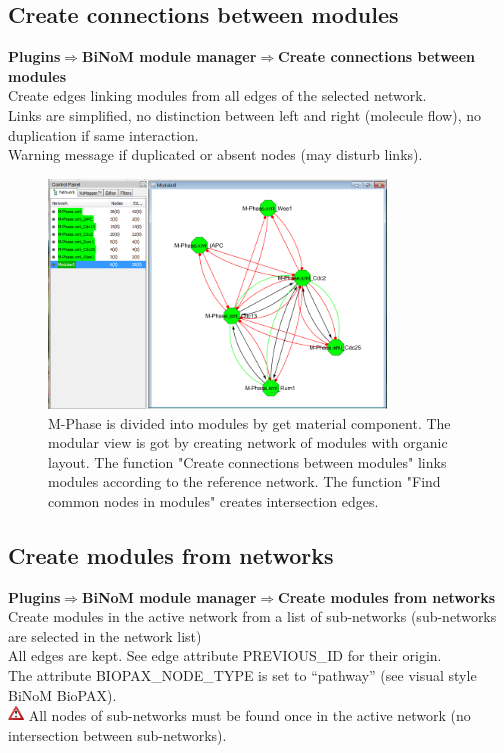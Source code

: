 \subsection{Create connections between modules}
\textbf{Plugins$\Rightarrow$BiNoM module manager$\Rightarrow$Create connections between modules}\\
Create edges linking modules from all edges of the selected network.\\
Links are simplified, no distinction between left and right (molecule flow), no duplication if same interaction.\\
Warning message if duplicated or absent nodes (may disturb links).
\begin{figure}
\centering
\includegraphics[width=0.8\textwidth]{graphics/M-Phase_Material_Modular}
\caption{M-Phase is divided into modules by get material component. The modular view is got by creating network of modules with organic layout. The function "Create connections between modules" links modules according to the reference network. The function "Find common nodes in modules" creates intersection edges. }
\label{M-Phase_Material_Modular}
\end{figure}

\subsection{Create modules from networks}
\textbf{Plugins$\Rightarrow$BiNoM module manager$\Rightarrow$Create modules from networks}\\
Create modules in the active network from a list of sub-networks (sub-networks are selected in the network list)\\
All edges are kept. See edge attribute PREVIOUS\_ID for their origin.\\
The attribute BIOPAX\_NODE\_TYPE is set to “pathway” (see visual style BiNoM BioPAX).\\
\includegraphics[width=12pt,height=12pt]{graphics/warning} All nodes of sub-networks must be found once in the active network (no intersection between sub-networks).

